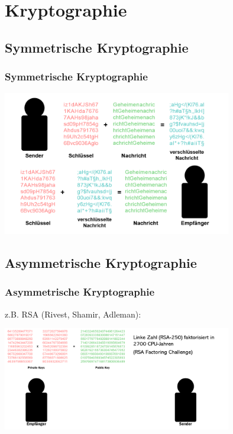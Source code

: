 \documentclass{beamer}
\begin{document}
\section{Kryptographie}

\subsection{Symmetrische Kryptographie}
\begin{frame}
\frametitle{Symmetrische Kryptographie}

\begin{center}
    \includegraphics[width=10cm]{Symmetrische Kryptographie.png}
    
\end{center}

\end{frame}

\subsection{Asymmetrische Kryptographie}
\begin{frame}
\frametitle{Asymmetrische Kryptographie}
z.B. RSA (Rivest, Shamir, Adleman):
\begin{center}
    \includegraphics[width=10cm]{Asymmetrische Kryptographie.png}
    
\end{center}

\end{frame}
\end{document}
